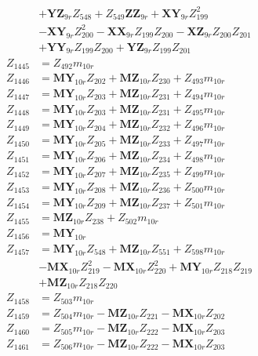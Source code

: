 \begin{multicols}{2}
\begin{align}
&+ \mathbf{YZ}_{9r}Z_{548} + Z_{549}\mathbf{ZZ}_{9r} + \mathbf{XY}_{9r}Z_{199}^2  \nonumber \\
&- \mathbf{XY}_{9r}Z_{200}^2 - \mathbf{XX}_{9r}Z_{199}Z_{200} - \mathbf{XZ}_{9r}Z_{200}Z_{201}  \nonumber \\
&+ \mathbf{YY}_{9r}Z_{199}Z_{200} + \mathbf{YZ}_{9r}Z_{199}Z_{201} \nonumber \\
Z_{1445} &= Z_{492}m_{10r} \nonumber \\
Z_{1446} &= \mathbf{MY}_{10r}Z_{202} + \mathbf{MZ}_{10r}Z_{230} + Z_{493}m_{10r} \nonumber \\
Z_{1447} &= \mathbf{MY}_{10r}Z_{203} + \mathbf{MZ}_{10r}Z_{231} + Z_{494}m_{10r} \nonumber \\
Z_{1448} &= \mathbf{MY}_{10r}Z_{203} + \mathbf{MZ}_{10r}Z_{231} + Z_{495}m_{10r} \nonumber \\
Z_{1449} &= \mathbf{MY}_{10r}Z_{204} + \mathbf{MZ}_{10r}Z_{232} + Z_{496}m_{10r} \nonumber \\
Z_{1450} &= \mathbf{MY}_{10r}Z_{205} + \mathbf{MZ}_{10r}Z_{233} + Z_{497}m_{10r} \nonumber \\
Z_{1451} &= \mathbf{MY}_{10r}Z_{206} + \mathbf{MZ}_{10r}Z_{234} + Z_{498}m_{10r} \nonumber \\
Z_{1452} &= \mathbf{MY}_{10r}Z_{207} + \mathbf{MZ}_{10r}Z_{235} + Z_{499}m_{10r} \nonumber \\
Z_{1453} &= \mathbf{MY}_{10r}Z_{208} + \mathbf{MZ}_{10r}Z_{236} + Z_{500}m_{10r} \nonumber \\
Z_{1454} &= \mathbf{MY}_{10r}Z_{209} + \mathbf{MZ}_{10r}Z_{237} + Z_{501}m_{10r} \nonumber \\
Z_{1455} &= \mathbf{MZ}_{10r}Z_{238} + Z_{502}m_{10r} \nonumber \\
Z_{1456} &= \mathbf{MY}_{10r} \nonumber \\
Z_{1457} &= \mathbf{MY}_{10r}Z_{548} + \mathbf{MZ}_{10r}Z_{551} + Z_{598}m_{10r}  \nonumber \\
&- \mathbf{MX}_{10r}Z_{219}^2 - \mathbf{MX}_{10r}Z_{220}^2 + \mathbf{MY}_{10r}Z_{218}Z_{219}  \nonumber \\
&+ \mathbf{MZ}_{10r}Z_{218}Z_{220} \nonumber \\
Z_{1458} &= Z_{503}m_{10r} \nonumber \\
Z_{1459} &= Z_{504}m_{10r} - \mathbf{MZ}_{10r}Z_{221} - \mathbf{MX}_{10r}Z_{202} \nonumber \\
Z_{1460} &= Z_{505}m_{10r} - \mathbf{MZ}_{10r}Z_{222} - \mathbf{MX}_{10r}Z_{203} \nonumber \\
Z_{1461} &= Z_{506}m_{10r} - \mathbf{MZ}_{10r}Z_{222} - \mathbf{MX}_{10r}Z_{203} \nonumber \\

\end{align}
\end{multicols}
